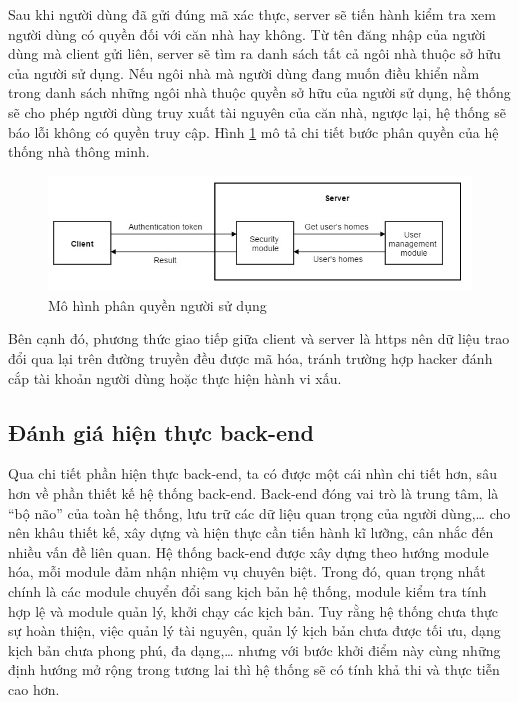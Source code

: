 \documentclass[12pt,a4paper,oneside]{extbook}
\begin{document}
\noindent
Sau khi người dùng đã gửi đúng mã xác thực, server sẽ tiến hành kiểm tra xem người dùng có quyền đối với căn nhà hay không. Từ tên đăng nhập của người dùng mà client gửi liên, server sẽ tìm ra danh sách tất cả ngôi nhà thuộc sở hữu của người sử dụng. Nếu ngôi nhà mà người dùng đang muốn điều khiển nằm trong danh sách những ngôi nhà thuộc quyền sở hữu của người sử dụng, hệ thống sẽ cho phép người dùng truy xuất tài nguyên của căn nhà, ngược lại, hệ thống sẽ báo lỗi không có quyền truy cập. Hình \ref{fig:6-authorization} mô tả chi tiết bước phân quyền của hệ thống nhà thông minh.

\begin{figure}[h]
  \centering
     \includegraphics[width=15cm]{6-authorization}
  \caption{Mô hình phân quyền người sử dụng}\label{fig:6-authorization}
\end{figure}

\noindent
Bên cạnh đó, phương thức giao tiếp giữa client và server là https nên dữ liệu trao đổi qua lại trên đường truyền đều được mã hóa, tránh trường hợp hacker đánh cắp tài khoản người dùng hoặc thực hiện hành vi xấu.

\subsection{Đánh giá hiện thực back-end}
\noindent
Qua chi tiết phần hiện thực back-end, ta có được một cái nhìn chi tiết hơn, sâu hơn về phần thiết kế hệ thống back-end. Back-end đóng vai trò là trung tâm, là “bộ não” của toàn hệ thống, lưu trữ các dữ liệu quan trọng của người dùng,\dots\hspace{0mm} cho nên khâu thiết kế, xây dựng và hiện thực cần tiến hành kĩ lưỡng, cân nhắc đến nhiều vấn đề liên quan. Hệ thống back-end được xây dựng theo hướng module hóa, mỗi module đảm nhận nhiệm vụ chuyên biệt. Trong đó, quan trọng nhất chính là các module chuyển đổi sang kịch bản hệ thống, module kiểm tra tính hợp lệ và module quản lý, khởi chạy các kịch bản. Tuy rằng hệ thống chưa thực sự hoàn thiện, việc quản lý tài nguyên, quản lý kịch bản chưa được tối ưu, dạng kịch bản chưa phong phú, đa dạng,\dots\hspace{0mm} nhưng với bước khởi điểm này cùng những định hướng mở rộng trong tương lai thì hệ thống sẽ có tính khả thi và thực tiễn cao hơn.
\end{document}
